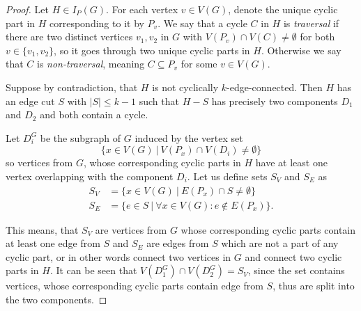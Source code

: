 \documentclass[12pt, twoside]{book}
\begin{document}
\begin{proof}
	Let $H\in I_P(G)$. For each vertex $v\in V(G)$, denote the unique cyclic part in $H$ corresponding to it by $P_v$. We say that a cycle $C$ in $H$ is \textit{traversal} if there are two distinct vertices $v_1,v_2$ in $G$ with $V(P_v)\cap V(C)\neq \emptyset$ for both $v\in\{v_1,v_2\}$, so it goes through two unique cyclic parts in $H$. Otherwise we say that $C$ is \textit{non-traversal}, meaning $C\subseteq P_v$ for some $v\in V(G)$.
	
	Suppose by contradiction, that $H$ is not cyclically $k$-edge-connected. Then $H$ has an edge cut $S$ with $|S|\leq k-1$ such that $H-S$ has precisely two components $D_1$ and $D_2$ and both contain a cycle.
	
	Let $D_i^G$ be the subgraph of $G$ induced by the vertex set $$\{x\in V(G)~|~ V(P_x)\cap V(D_i)\neq \emptyset\}$$
	so vertices from $G$, whose corresponding cyclic parts in $H$ have at least one vertex overlapping with the component $D_i$. Let us define sets $S_V$ and $S_E$ as
	\begin{align*}
		S_V &= \{x\in V(G) ~|~ E(P_x)\cap S\neq \emptyset\} \\
		S_E &= \{e\in S ~|~ \forall x\in V(G): e\notin E(P_x) \}.
	\end{align*}
	
	This means, that $S_V$ are vertices from $G$ whose corresponding cyclic parts contain at least one edge from $S$ and $S_E$ are edges from $S$ which are not a part of any cyclic part, or in other words connect two vertices in $G$ and connect two cyclic parts in $H$. It can be seen that ${V(D_1^G)\cap V(D_2^G)=S_V}$, since the set contains vertices, whose corresponding cyclic parts contain edge from $S$, thus are split into the two components.
	

\end{proof}
\end{document}
